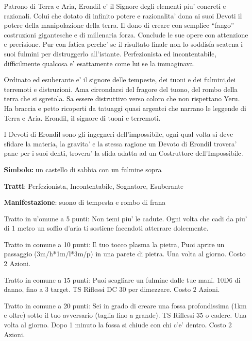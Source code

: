 \documentclass[a4paper,11pt,twoside,openany]{dndbook}
\begin{document}
{\label{erondil}

Patrono di Terra e Aria, Erondil e' il Signore degli elementi piu' concreti e razionali. Colui che dotato di infinito potere e razionalita' dona ai suoi Devoti il potere della manipolazione della terra. Il dono di creare con semplice ``fango'' costruzioni gigantesche e di millenaria forza. Conclude le sue opere con attenzione e precisione. Pur con fatica perche' se il risultato finale non lo soddisfa scatena i suoi fulmini per distruggerlo all'istante. Perfezionista ed incontentabile, difficilmente qualcosa e' esattamente come lui se la immaginava. 

Ordinato ed esuberante e' il signore delle tempeste, dei tuoni e dei fulmini,dei terremoti e distruzioni. Ama circondarsi del fragore del tuono, del rombo della terra che si sgretola. Sa essere distruttivo verso coloro che non rispettano Yeru.
Ha braccia e petto ricoperti da tatuaggi quasi argentei che narrano le leggende di Terra e Aria. Erondil, il signore di tuoni e terremoti.


I Devoti di Erondil sono gli ingegneri dell'impossibile, ogni qual volta si deve sfidare la materia, la gravita' e la stessa ragione un Devoto di Erondil trovera' pane per i suoi denti, trovera' la sfida adatta ad un Costruttore dell'Impossibile.

\textbf{Simbolo:} un castello di sabbia con un fulmine sopra

\textbf{Tratti}: Perfezionista, Incontentabile, Sognatore, Esuberante

\textbf{Manifestazione}: suono di tempesta e rombo di frana

\bigskip

Tratto in u'omune a 5 punti: Non temi piu' le cadute. Ogni volta che cadi da piu' di 1 metro un soffio d'aria ti sostiene facendoti atterrare dolcemente.

Tratto in comune a 10 punti: Il tuo tocco plasma la pietra, Puoi aprire un passaggio (3m/h{*}1m/l{*}3m/p) in una parete di pietra. Una volta al giorno. Costo 2 Azioni.

Tratto in comune a 15 punti: Puoi scagliare un fulmine dalle tue mani. 10D6 di danno, fino a 3 target. TS Riflessi DC 30 per dimezzare. Costo 2 Azioni.

Tratto in comune a 20 punti: Sei in grado di creare una fossa profondissima (1km e oltre) sotto il tuo avversario (taglia fino a grande). TS Riflessi 35 o cadere. Una volta al giorno. Dopo 1 minuto la fossa si chiude con chi c'e' dentro. Costo 2 Azioni.

}
\end{document}
